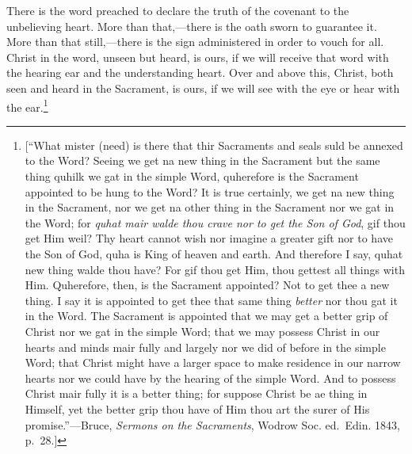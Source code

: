 \documentclass[
]{book}
\begin{document}
There is the word preached to declare the truth of the covenant to the unbelieving heart. More than that,---there is the oath sworn to guarantee it. More than that still,---there is the sign administered in order to vouch for all. Christ in the word, unseen but heard, is ours, if we will receive that word with the hearing ear and the understanding heart. Over and above this, Christ, both seen and heard in the Sacrament, is ours, if we will see with the eye or hear with the ear.\footnote{{[}``What mister (need) is there that thir Sacraments and seals suld be annexed to the Word? Seeing we get na new thing in the Sacrament but the same thing quhilk we gat in the simple Word, quherefore is the Sacrament appointed to be hung to the Word? It is true certainly, we get na new thing in the Sacrament, nor we get na other thing in the Sacrament nor we gat in the Word; for \emph{quhat mair walde thou crave nor to get the Son of God}, gif thou get Him weil? Thy heart cannot wish nor imagine a greater gift nor to have the Son of God, quha is King of heaven and earth. And therefore I say, quhat new thing walde thou have? For gif thou get Him, thou gettest all things with Him. Quherefore, then, is the Sacrament appointed? Not to get thee a new thing. I say it is appointed to get thee that same thing \emph{better} nor thou gat it in the Word. The Sacrament is appointed that we may get a better grip of Christ nor we gat in the simple Word; that we may possess Christ in our hearts and minds mair fully and largely nor we did of before in the simple Word; that Christ might have a larger space to make residence in our narrow hearts nor we could have by the hearing of the simple Word. And to possess Christ mair fully it is a better thing; for suppose Christ be ae thing in Himself, yet the better grip thou have of Him thou art the surer of His promise.''---Bruce, \emph{Sermons on the Sacraments}, Wodrow Soc. ed.~Edin. 1843, p.~28.{]}}
\end{document}
